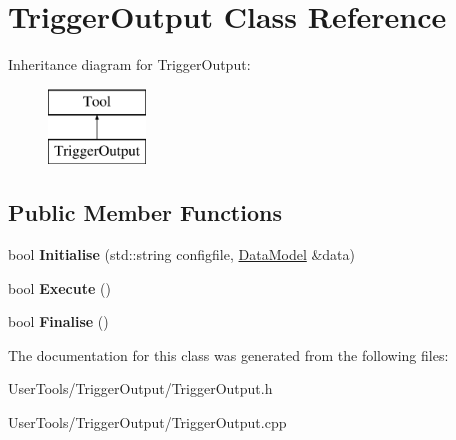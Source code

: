 \hypertarget{classTriggerOutput}{\section{Trigger\-Output Class Reference}
\label{classTriggerOutput}
}
Inheritance diagram for Trigger\-Output\-:\begin{figure}[H]
\begin{center}
\leavevmode
\includegraphics[height=2.000000cm]{classTriggerOutput}
\end{center}
\end{figure}
\subsection*{Public Member Functions}
\begin{DoxyCompactItemize}
\item 
\hypertarget{classTriggerOutput_a0f648ec8454242e53b16952c7639e4c6}{bool {\bfseries Initialise} (std\-::string configfile, \hyperlink{classDataModel}{Data\-Model} \&data)}\label{classTriggerOutput_a0f648ec8454242e53b16952c7639e4c6}

\item 
\hypertarget{classTriggerOutput_abb1e16e5c50df9db56d8e0e82e275b04}{bool {\bfseries Execute} ()}\label{classTriggerOutput_abb1e16e5c50df9db56d8e0e82e275b04}

\item 
\hypertarget{classTriggerOutput_a6fbc1d67082eda7453e9dbff7ba9b16e}{bool {\bfseries Finalise} ()}\label{classTriggerOutput_a6fbc1d67082eda7453e9dbff7ba9b16e}

\end{DoxyCompactItemize}


The documentation for this class was generated from the following files\-:\begin{DoxyCompactItemize}
\item 
User\-Tools/\-Trigger\-Output/Trigger\-Output.\-h\item 
User\-Tools/\-Trigger\-Output/Trigger\-Output.\-cpp\end{DoxyCompactItemize}
